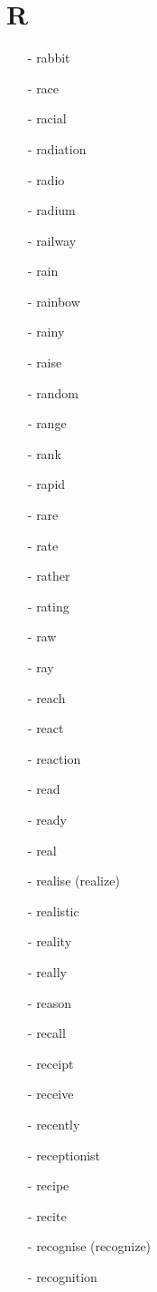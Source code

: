 \documentclass[../../book.tex]{subfiles}
\begin{document}
\section{R}
\raggedcolumns
\begin{multicols}{2}
\begin{itemize}
\item[-] rabbit
\item[-] race
\item[-] racial
\item[-] radiation
\item[-] radio
\item[-] radium
\item[-] railway
\item[-] rain
\item[-] rainbow
\item[-] rainy
\item[-] raise
\item[-] random
\item[-] range
\item[-] rank
\item[-] rapid
\item[-] rare
\item[-] rate
\item[-] rather
\item[-] rating
\item[-] raw
\item[-] ray
\item[-] reach
\item[-] react
\item[-] reaction
\item[-] read
\item[-] ready
\item[-] real
\item[-] realise (realize)
\item[-] realistic
\item[-] reality
\item[-] really
\item[-] reason
\item[-] recall
\item[-] receipt
\item[-] receive
\item[-] recently
\item[-] receptionist
\item[-] recipe
\item[-] recite
\item[-] recognise (recognize)
\item[-] recognition

\end{itemize}
\end{multicols}
\end{document}
